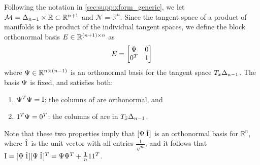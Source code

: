 Following the notation in \cref{sec:supp:xform_generic}, we let $\mathcal{M} = \Delta_{n-1} \times \mathbb{R} \subset \mathbb{R}^{n+1}$ and $\mathcal{N} = \mathbb{R}^{n}$.
Since the tangent space of a product of manifolds is the product of the individual tangent spaces, we define the block orthonormal basis $E \in \mathbb{R}^{(n+1) \times n}$ as
\begin{align}
    E =
    \begin{bmatrix}
        \Psi & \mathrm{0} \\
        \mathrm{0}^T   & 1
    \end{bmatrix}
\end{align}
where $\Psi \in \mathbb{R}^{n \times (n-1)}$ is an orthonormal basis for the tangent space $T_{\bar{x}} \Delta_{n-1}$.
The basis $\Psi$ is fixed, and satisfies both:
\begin{enumerate}
    \item $\Psi^T \Psi = \mathrm{I}$: the columns of \vv{\Psi} are orthonormal, and
    \item $\mathrm{1}^T \Psi = \mathrm{0}^T$: the columns of \vv{\Psi} are in $T_{\bar{x}} \Delta_{n-1}$.
\end{enumerate}
Note that these two properties imply that $[ \Psi \, \hat{\mathrm{1}} ]$ is an orthonormal basis for $\mathbb{R}^{n}$, where $\hat{\mathrm{1}}$ is the unit vector with all entries $\frac{1}{\sqrt{n}}$, and it follows that $\mathrm{I} = [ \Psi \, \hat{\mathrm{1}} ] [ \Psi \, \hat{\mathrm{1}} ]^T = \Psi \Psi^T + \frac{1}{n} \mathrm{1} \mathrm{1}^T$.

